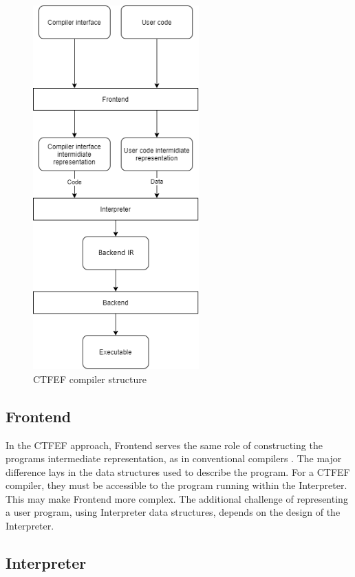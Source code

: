 \begin{figure}
	\includegraphics[height=14cm]{pictures/compiler-structure.png}
	\caption{CTFEF compiler structure}
	\label{CTFE-first-compiler-structure}
\end{figure}

\subsection{Frontend}
\label{Frontend}

In the CTFEF approach, Frontend serves the same role of constructing the programs intermediate representation, as in conventional compilers \cite{puntambekar:compiler_design}.
The major difference lays in the data structures used to describe the program.
For a CTFEF compiler, they must be accessible to the program running within the Interpreter.
This may make Frontend more complex.
The additional challenge of representing a user program, using Interpreter data structures, depends on the design of the Interpreter.


\subsection{Interpreter}
\label{Interpreter}

